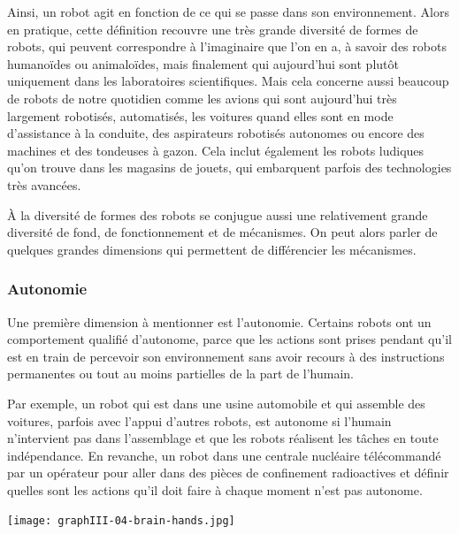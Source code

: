 Ainsi, un robot agit en fonction de ce qui se passe dans son environnement. Alors en pratique, cette définition recouvre une très grande diversité de formes de robots, qui peuvent correspondre à l'imaginaire que l'on en a, à savoir des robots humanoïdes ou animaloïdes, mais finalement qui aujourd'hui sont plutôt uniquement dans les laboratoires scientifiques. Mais cela concerne aussi beaucoup de robots de notre quotidien comme les avions qui sont aujourd'hui très largement robotisés, automatisés, les voitures quand elles sont en mode d'assistance à la conduite, des aspirateurs robotisés autonomes ou encore des machines et des tondeuses à gazon. Cela inclut également les robots ludiques qu'on trouve dans les magasins de jouets, qui embarquent parfois des technologies très avancées. 

À la diversité de formes des robots se conjugue aussi une relativement grande diversité de fond, de fonctionnement et de mécanismes. On peut alors parler de quelques grandes dimensions qui permettent de différencier les mécanismes. 

\subsubsection[Autonomie]{Autonomie}
\label{subsub:III.2.1.2}

Une première dimension à mentionner est l'autonomie. Certains robots ont un comportement qualifié d'autonome, parce que les actions sont prises pendant qu'il est en train de percevoir son environnement sans avoir recours à des instructions permanentes ou tout au moins partielles de la part de l'humain. 

Par exemple, un robot qui est dans une usine automobile et qui assemble des voitures, parfois avec l'appui d'autres robots, est autonome si l'humain n'intervient pas dans l'assemblage et que les robots réalisent les tâches en toute indépendance.
En revanche, un robot dans une centrale nucléaire télécommandé par un opérateur pour aller dans des pièces de confinement radioactives et définir quelles sont les actions qu'il doit faire à chaque moment n'est pas autonome. 

\begin{fullwidth}
\texttt{[image: graphIII-04-brain-hands.jpg]}
\end{fullwidth}

